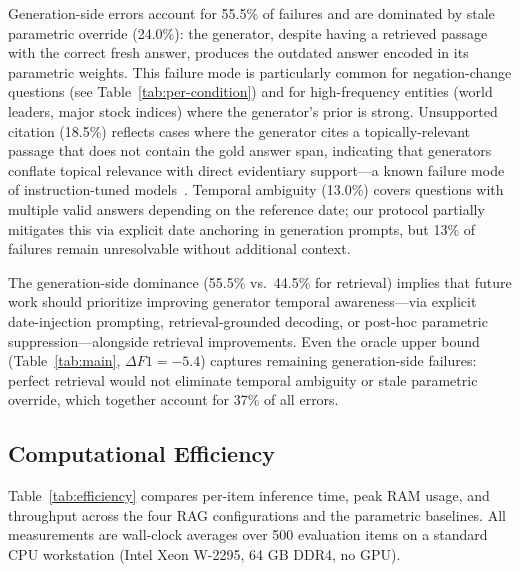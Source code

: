 Generation-side errors account for 55.5\% of failures and are dominated by stale parametric override (24.0\%): the generator, despite having a retrieved passage with the correct fresh answer, produces the outdated answer encoded in its parametric weights. This failure mode is particularly common for negation-change questions (see Table~\ref{tab:per-condition}) and for high-frequency entities (world leaders, major stock indices) where the generator's prior is strong. Unsupported citation (18.5\%) reflects cases where the generator cites a topically-relevant passage that does not contain the gold answer span, indicating that generators conflate topical relevance with direct evidentiary support---a known failure mode of instruction-tuned models~\citep{gao2023enabling,min2023factscore}. Temporal ambiguity (13.0\%) covers questions with multiple valid answers depending on the reference date; our protocol partially mitigates this via explicit date anchoring in generation prompts, but 13\% of failures remain unresolvable without additional context.

The generation-side dominance (55.5\% vs.\ 44.5\% for retrieval) implies that future work should prioritize improving generator temporal awareness---via explicit date-injection prompting, retrieval-grounded decoding, or post-hoc parametric suppression---alongside retrieval improvements. Even the oracle upper bound (Table~\ref{tab:main}, $\Delta F1 = -5.4$) captures remaining generation-side failures: perfect retrieval would not eliminate temporal ambiguity or stale parametric override, which together account for 37\% of all errors.

\subsection{Computational Efficiency}

Table~\ref{tab:efficiency} compares per-item inference time, peak RAM usage, and throughput across the four RAG configurations and the parametric baselines. All measurements are wall-clock averages over 500 evaluation items on a standard CPU workstation (Intel Xeon W-2295, 64 GB DDR4, no GPU).

